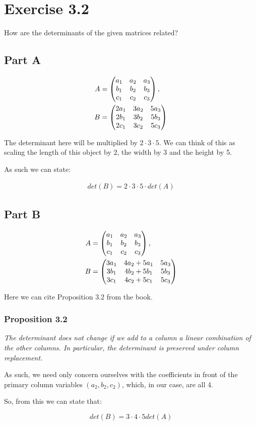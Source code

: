 \section*{Exercise 3.2}

How are the determinants of the given matrices related?

\subsection*{Part A}

\[
	\begin{aligned}
		A &= 
		\genericmat{p}{a_1 & a_2 & a_3 \\ b_1 & b_2 & b_3 \\ c_1 & c_2 & c_3},
		\\
		B &=
		\genericmat{p}{2a_1 & 3a_2 & 5a_3 \\ 2b_1 & 3b_2 & 5b_3 \\ 2c_1 & 3c_2 & 5c_3}
	\end{aligned}
\]

The determinant here will be multiplied by $2 \cdot 3 \cdot 5$. We can think of this as scaling the length of this object by 2, the width by 3 and the height by 5. 

As such we can state:

\[
	\begin{aligned}
		det(B) = 2 \cdot 3 \cdot 5 \cdot det(A)
	\end{aligned}
\]

\subsection*{Part B}

\[
	\begin{aligned}
		A &= \genericmat{p}{a_1 & a_2 & a_3 \\ b_1 & b_2 & b_3 \\ c_1 & c_2 & c_3},
		\\
		B &= \genericmat{p}{3a_1 & 4a_2 + 5a_1 & 5a_3 \\ 3b_1 & 4b_2 + 5b_1 & 5b_3 \\ 3c_1 & 4c_2 + 5c_1 & 5c_3}
	\end{aligned}
\]

Here we can cite Proposition 3.2 from the book.

\subsubsection{Proposition 3.2}

\emph{The determinant does not change if we add to a column a linear combination of the other columns. In particular, the determinant is preserved under column replacement.}

As such, we need only concern ourselves with the coefficients in front of the primary column variables $\left( a_2, b_2, c_2 \right)$, which, in our case, are all 4.

So, from this we can state that:

\[
	det(B) = 3 \cdot 4 \cdot 5 det(A)
\]

